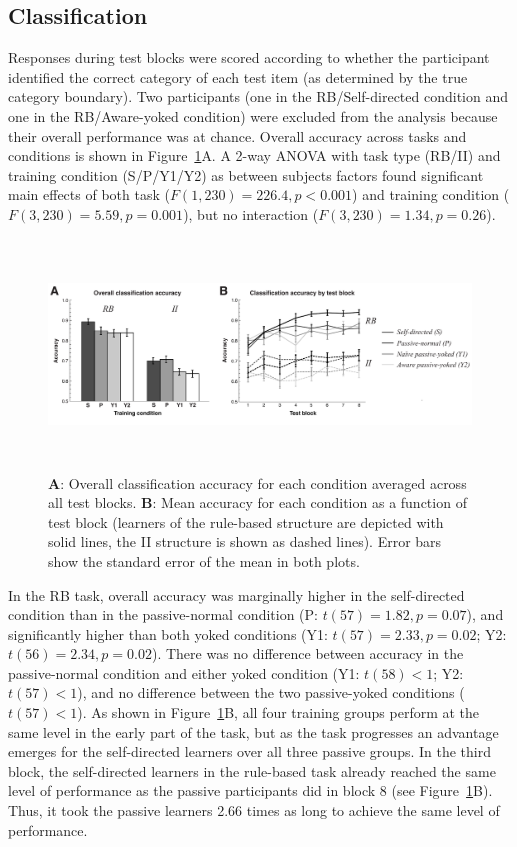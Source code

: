 \documentclass[3p,twocolumn,authoryear,10pt]{elsarticle}
\begin{document}
\subsection{Classification}
Responses during test blocks were scored according to whether the participant identified the correct category of each test item (as determined by the true category boundary). Two participants (one in the RB/Self-directed condition and one in the RB/Aware-yoked condition) were excluded from the analysis because their overall performance was at chance. Overall accuracy across tasks and conditions is shown in Figure~\ref{accuracy.fig}A. A 2-way ANOVA with task type (RB/II) and training condition (S/P/Y1/Y2) as between subjects factors found significant main effects of both task ($F(1,230)=226.4,p<0.001$) and training condition ($F(3,230)=5.59,p=0.001$), but no interaction ($F(3,230)=1.34, p=0.26$).


\begin{figure}[t]
\centerline{\includegraphics[height=2.4in]{figures/accuracycurves.pdf}}
\caption{\textbf{A}: Overall classification accuracy for each condition averaged across all test blocks. \textbf{B}: Mean accuracy for each condition as a function of test block (learners of the rule-based structure are depicted with solid lines, the II structure is shown as dashed lines). Error bars show the standard error of the mean in both plots.}
\label{accuracy.fig}
\end{figure}


In the RB task, overall accuracy was marginally higher in the self-directed condition than in the passive-normal condition (P: $t(57)=1.82, p=0.07$), and significantly higher than both yoked conditions (Y1: $t(57)=2.33,p=0.02$; Y2: $t(56)=2.34,p=0.02$). There was no difference between accuracy in the passive-normal condition and either yoked condition (Y1: $t(58)<1$; Y2: $t(57)<1$), and no difference between the two passive-yoked conditions ($t(57)<1$). As shown in Figure~\ref{accuracy.fig}B, all four training groups perform at the same level in the early part of the task, but as the task progresses an advantage emerges for the self-directed learners over all three passive groups.  In the third block, the self-directed learners in the rule-based task already reached the same level of performance as the passive participants did in block 8 (see Figure~\ref{accuracy.fig}B).  Thus, it took the passive learners 2.66 times as long to achieve the same level of performance.
\end{document}
